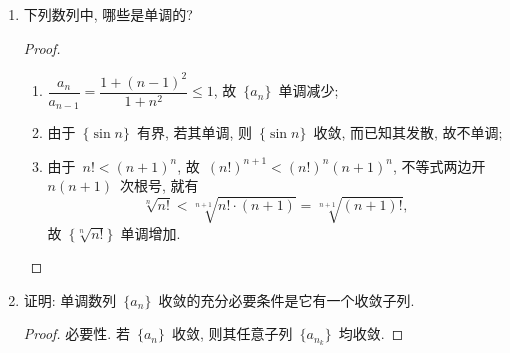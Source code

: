 \documentclass[UTF8,a4paper,10pt,twoside]{book}
\begin{document}
\begin{enumerate}
\begin{proof}
\begin{equation*}
\begin{split}
				      =&\left(\dfrac{2}{1^2}\right)\left(\dfrac{2\cdot4}{3^2}\right)\left(\dfrac{4\cdot6}{5^2}\right)\cdots\left(\dfrac{(2n-2)(2n)}{(2n-1)^2}\right)\cdot\dfrac{2n}{2n+1}\leqslant2.
			      \end{split}
		      \end{equation*}
		      其中用到了基本不等式~$(2n-2)(2n)\leqslant\left(\dfrac{(2n-2)+(2n)}{2}\right)^2=(2n-1)^2$, 即~$\dfrac{(2n-2)(2n)}{(2n-1)^2}\leqslant 1$, 于是~$\{a_n\}$~有上界; 又由
		      \[
			      \dfrac{a_n}{a_{n-1}}=\left(\dfrac{2n}{2n-1}\right)^2\dfrac{2n-1}{2n+1}=\dfrac{4n^2}{4n^2-1}\geqslant 1.
		      \]
		      故~$\{a_n\}$~单调增加. 由单调有界原理知~$\{a_n\}$~收敛.\qedhere

	      \end{proof}
	\item 下列数列中, 哪些是单调的?
	      \begin{tabenum}[(1)]
		      \item $\left\{\dfrac{1}{1+n^2}\right\}$; \item $\{\sin{n}\}$;	\item $\{\sqrt[n]{n!}\}$.
	      \end{tabenum}
	      \begin{proof}
		      \begin{enumerate}[(1)]
			      \item $\dfrac{a_n}{a_{n-1}}=\dfrac{1+(n-1)^2}{1+n^2}\leqslant 1$, 故~$\{a_n\}$~单调减少;
			      \item 由于~$\{\sin{n}\}$~有界, 若其单调, 则~$\{\sin{n}\}$~收敛, 而已知其发散, 故不单调;
			      \item 由于~$n!<(n+1)^n$, 故~$(n!)^{n+1}<(n!)^n(n+1)^n$, 不等式两边开~$n(n+1)$~次根号, 就有
			            \[
				            \sqrt[n]{n!}<\sqrt[n+1]{n!\cdot (n+1)}=\sqrt[n+1]{(n+1)!},
			            \]
			            故~$\{\sqrt[n]{n!}\}$~单调增加.\qedhere
		      \end{enumerate}
	      \end{proof}
	\item 证明: 单调数列~$\{a_n\}$~收敛的充分必要条件是它有一个收敛子列.
	      \begin{proof}
		      必要性. 若~$\{a_n\}$~收敛, 则其任意子列~$\{a_{n_k}\}$~均收敛.


\end{proof}
\end{enumerate}
\end{document}
